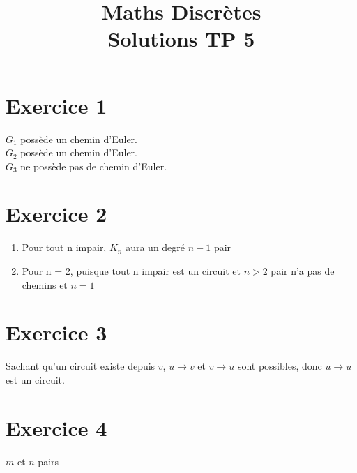 \documentclass[fontsize=10pt]{article}
\title{\textbf{Maths Discrètes}\\ Solutions TP 5}
\date{}
\begin{document}
\maketitle %


\section*{Exercice 1}
$G_1$ possède un chemin d'Euler.\\
$G_2$ possède un chemin d'Euler.\\
$G_3$ ne possède pas de chemin d'Euler.

\section*{Exercice 2}
\begin{enumerate}
\item Pour tout n impair, $K_n$ aura un degré $n-1$ pair
\item Pour n = 2, puisque tout n impair est un circuit et $n>2$ pair n'a pas de chemins et $n=1$
\end{enumerate}

\section*{Exercice 3}

Sachant qu'un circuit existe depuis $v$, $u \rightarrow v$ et $v \rightarrow u$ sont possibles, donc $u \rightarrow u$ est un circuit.

\section*{Exercice 4}
$m$ et $n$ pairs
\newpage
\end{document}
